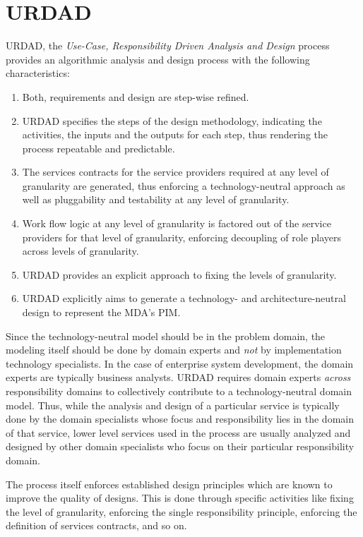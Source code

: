 \section{URDAD}
\label{sec:urdad}

URDAD, the {\em Use-Case, Responsibility Driven Analysis and Design} process provides an
algorithmic analysis and design process with the following characteristics:
\begin{enumerate}
  \item Both, requirements and design are step-wise refined.
  \item URDAD specifies the steps of the design methodology, indicating the activities, the
			inputs and the outputs for each step, thus rendering the process repeatable
			and predictable.
  \item The services contracts for the service providers required at any
			level of granularity are generated,  thus enforcing a technology-neutral approach as well as
			pluggability and testability at any level of	granularity.
	\item Work flow logic at any level of granularity is factored out of the service
			providers for that level of granularity, enforcing decoupling of role players
			across levels of granularity.
	\item URDAD provides an explicit approach to fixing the levels of granularity.
   \item URDAD explicitly aims to generate a technology- and architecture-neutral design
			to represent the MDA's PIM.
\end{enumerate}

Since the technology-neutral model should be in the problem domain, the modeling itself should be done by domain experts and \emph{not} by implementation technology specialists. In the case of enterprise system development, the domain experts are typically business analysts. URDAD requires domain experts \emph{across} responsibility domains to collectively contribute to a technology-neutral domain model. Thus, while the analysis and design of a particular service is typically done by the domain specialists whose focus and responsibility lies in the domain of that service, lower level services used in the process are usually analyzed and designed by other domain specialists who focus on their particular responsibility domain.

The process itself enforces established design principles which are known to improve the quality of designs. This is done through specific activities like fixing the level of granularity, enforcing the single responsibility principle, enforcing the definition of services contracts, and so on.

